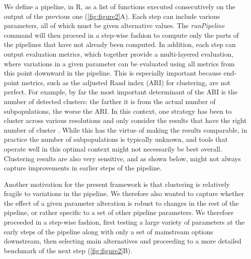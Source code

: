 \documentclass{bmcart}
\begin{document}
We define a pipeline, in R, as a list of functions executed consecutively on the output of the previous one (\ref{fig:figure2}A). Each step can include various parameters, all of which must be given alternative values. The \textit{runPipeline} command will then proceed in a step-wise fashion to compute only the parts of the pipelines that have not already been computed. In addition, each step can output evaluation metrics, which together provide a multi-layered evaluation, where variations in a given parameter can be evaluated using all metrics from this point downward in the pipeline. This is especially important because end-point metrics, such as the adjusted Rand index (ARI) for clustering, are not perfect. For example, by far the most important determinant of the ARI is the number of detected clusters: the farther it is from the actual number of subpopulations, the worse the ARI. In this context, one strategy has been to cluster across various resolutions and only consider the results that have the right number of cluster \citep{duoClustering2018}. While this has the virtue of making the results comparable, in practice the number of subpopulations is typically unknown, and tools that operate well in this optimal context might not necessarily be best overall. Clustering results are also very sensitive, and as shown below, might not always capture improvements in earlier steps of the pipeline.

Another motivation for the present framework is that clustering is relatively fragile to variations in the pipeline. We therefore also wanted to capture whether the effect of a given parameter alteration is robust to changes in the rest of the pipeline, or rather specific to a set of other pipeline parameters. We therefore proceeded in a step-wise fashion, first testing a large variety of parameters at the early steps of the pipeline along with only a set of mainstream options downstream, then selecting main alternatives and proceeding to a more detailed benchmark of the next step (\ref{fig:figure2}B).
\end{document}
